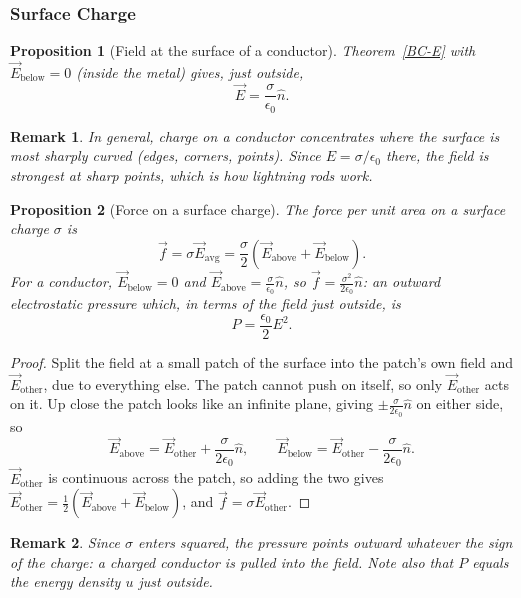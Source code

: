 \documentclass{article}
\newtheorem{remark}{Remark}
\newtheorem{proposition}{Proposition}
\begin{document}
\subsubsection{Surface Charge}
\begin{proposition}[Field at the surface of a conductor]
    Theorem~\ref{BC-E} with $\vec{E}_{\text{below}} = 0$ (inside the metal) gives, just outside,
    \[\vec{E} = \frac{\sigma}{\epsilon_0}\hat{n}.\]
\end{proposition}
\begin{remark}
    In general, charge on a conductor concentrates where the surface is most sharply curved (edges, corners, points). Since $E = \sigma/\epsilon_0$ there, the field is strongest at sharp points, which is how lightning rods work.
\end{remark}
\begin{proposition}[Force on a surface charge]
    \label{prop:surface-force}
    The force per unit area on a surface charge $\sigma$ is
    \begin{equation}
        \vec{f} = \sigma\vec{E}_{\text{avg}} = \frac{\sigma}{2}\left(\vec{E}_{\text{above}} + \vec{E}_{\text{below}}\right).
    \end{equation}
    For a conductor, $\vec{E}_{\text{below}} = 0$ and $\vec{E}_{\text{above}} = \frac{\sigma}{\epsilon_0}\hat{n}$, so $\vec{f} = \frac{\sigma^2}{2\epsilon_0}\hat{n}$: an outward electrostatic pressure which, in terms of the field just outside, is
    \begin{equation}
        P = \frac{\epsilon_0}{2}E^2.
    \end{equation}
\end{proposition}
\begin{proof}
    Split the field at a small patch of the surface into the patch's own field and $\vec{E}_{\text{other}}$, due to everything else. The patch cannot push on itself, so only $\vec{E}_{\text{other}}$ acts on it. Up close the patch looks like an infinite plane, giving $\pm\frac{\sigma}{2\epsilon_0}\hat{n}$ on either side, so
    \[\vec{E}_{\text{above}} = \vec{E}_{\text{other}} + \frac{\sigma}{2\epsilon_0}\hat{n}, \qquad \vec{E}_{\text{below}} = \vec{E}_{\text{other}} - \frac{\sigma}{2\epsilon_0}\hat{n}.\]
    $\vec{E}_{\text{other}}$ is continuous across the patch, so adding the two gives $\vec{E}_{\text{other}} = \frac{1}{2}\left(\vec{E}_{\text{above}} + \vec{E}_{\text{below}}\right)$, and $\vec{f} = \sigma\vec{E}_{\text{other}}$.
\end{proof}
\begin{remark}
    Since $\sigma$ enters squared, the pressure points outward whatever the sign of the charge: a charged conductor is pulled into the field. Note also that $P$ equals the energy density $u$ just outside.
\end{remark}
\end{document}
